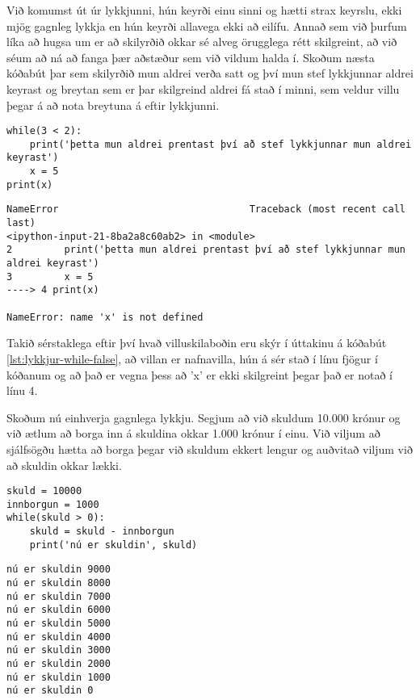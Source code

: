 Við komumst út úr lykkjunni, hún keyrði einu sinni og hætti strax keyrslu, ekki mjög gagnleg lykkja en hún keyrði allavega ekki að eilífu.
Annað sem við þurfum líka að hugsa um er að skilyrðið okkar sé alveg örugglega rétt skilgreint, að við séum að ná að fanga þær aðstæður sem við vildum halda í.
Skoðum næsta kóðabút þar sem skilyrðið mun aldrei verða satt og því mun stef lykkjunnar aldrei keyrast og breytan sem er þar skilgreind aldrei fá stað í minni, sem veldur villu þegar á að nota breytuna á eftir lykkjunni. 

\begin{lstlisting}[caption=while lykkja sem keyrir aldrei, label=lst:lykkjur-while-false]
while(3 < 2):
	print('þetta mun aldrei prentast því að stef lykkjunnar mun aldrei keyrast')
	x = 5
print(x)
\end{lstlisting}
\lstset{style=uttak}
\begin{lstlisting}
NameError                                 Traceback (most recent call last)
<ipython-input-21-8ba2a8c60ab2> in <module>
2         print('þetta mun aldrei prentast því að stef lykkjunnar mun aldrei keyrast')
3         x = 5
----> 4 print(x)

NameError: name 'x' is not defined
\end{lstlisting}
\lstset{style=venjulegt}

Takið sérstaklega eftir því hvað villuskilaboðin eru skýr í úttakinu á kóðabút \ref{lst:lykkjur-while-false}, að villan er nafnavilla, hún á sér stað í línu fjögur í kóðanum og að það er vegna þess að 'x' er ekki skilgreint þegar það er notað í línu 4.

Skoðum nú einhverja gagnlega lykkju.
Segjum að við skuldum 10.000 krónur og við ætlum að borga inn á skuldina okkar 1.000 krónur í einu.
Við viljum að sjálfsögðu hætta að borga þegar við skuldum ekkert lengur og auðvitað viljum við að skuldin okkar lækki.

\begin{lstlisting}[caption=while lykkja sem eitthvað vit er í, label=lst:lykkjur-while-skuld]
skuld = 10000
innborgun = 1000
while(skuld > 0):
	skuld = skuld - innborgun
	print('nú er skuldin', skuld)
\end{lstlisting}
\lstset{style=uttak}
\begin{lstlisting}
nú er skuldin 9000
nú er skuldin 8000
nú er skuldin 7000
nú er skuldin 6000
nú er skuldin 5000
nú er skuldin 4000
nú er skuldin 3000
nú er skuldin 2000
nú er skuldin 1000
nú er skuldin 0
\end{lstlisting}
\lstset{style=venjulegt}

